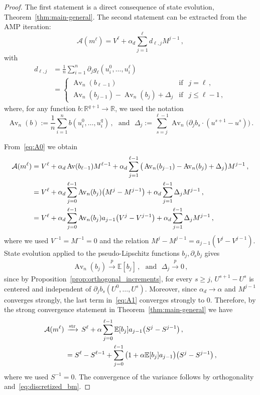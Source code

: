 \documentclass[11pt]{article}
\theoremstyle{definition}
\theoremstyle{remark}
\numberwithin{equation}{section}
\numberwithin{theorem}{section}
\newcommand{\R}{\mathbb R}
\newcommand{\E}{\mathbb E}
\newcommand{\cA}{\mathcal A}
\newcommand{\Av}{\operatorname{Av}}
\begin{document}
\begin{proof}
The first statement is a direct consequence of state evolution, Theorem~\ref{thm:main-general}. The second statement can be extracted from the AMP iteration:
\begin{equation}\label{eq:A0}
	\cA(m^\ell) = V^{\ell} + \alpha_d \sum_{j=1}^\ell d_{\ell,j} M^{j-1}\,,
\end{equation}
  with 
\begin{align}
d_{\ell,j} &= \frac{1}{n} \sum_{i=1}^n \partial_{j}g_{\ell}(u_i^0,\ldots,u_i^\ell)\\
&=
\begin{cases}
\Av_n(b_{\ell-1}) & \mbox{if }~~ j=\ell\,,\\
\Av_n(b_{j-1}) - \Av_n(b_j) + \Delta_j & \mbox{if }~~ j\le\ell-1\,,
\end{cases}
\end{align}
where, for any function $b : \R^{q+1}\to \R$, we used the notation 
\[\Av_n(b) := \frac{1}{n} \sum_{i=1}^n b(u_i^0,\ldots,u_i^q)\,,~~~\mbox{and}~~~ \Delta_j := \sum_{s = j}^{\ell-1} \Av_n\Big(\partial_j b_s \cdot (u^{s+1} - u^s)\Big)\,.\]

From~\eqref{eq:A0} we obtain
\begin{align}\label{eq:A1}
\cA(m^\ell) &= V^{\ell} + \alpha_d  \Av(b_{\ell-1}) M^{\ell-1} + \alpha_d \sum_{j=1}^{\ell-1} \big(\Av_n(b_{j-1}) - \Av_n(b_j) + \Delta_j\big) M^{j-1}\,,\notag\\
&= V^{\ell} + \alpha_d \sum_{j=0}^{\ell-1} \Av_n(b_{j}) \big(M^j - M^{j-1}\big) + \alpha_d \sum_{j=1}^{\ell-1}  \Delta_j M^{j-1}\,,\notag\\
&= V^\ell + \alpha_d \sum_{j=0}^{\ell-1} \Av_n(b_{j}) a_{j-1} \big(V^j - V^{j-1}\big) + \alpha_d \sum_{j=1}^{\ell-1}  \Delta_j M^{j-1}\,,
\end{align}
where we used $V^{-1}=M^{-1}=0$ and the relation $M^{j}-M^{j-1} = a_{j-1}(V^{j}-V^{j-1})$. 
%
State evolution applied to the pseudo-Lipschitz functions $b_j, \partial_s b_j$ gives 
\begin{align*}
\Av_n(b_j) \xrightarrow{p} \E[b_j] \,,~~~\mbox{and}~~~ \Delta_j\xrightarrow{p} 0 \,,
\end{align*}
since by Proposition~\ref{prop:orthogonal_increments}, for every $s\ge j$, $U^{s+1}-U^s$ is centered and independent of $\partial_jb_s(U^0,\ldots,U^s)$. Moreover, since $\alpha_d \to \alpha$ and $M^{j-1}$ converges strongly, the last term in~\eqref{eq:A1} converges strongly to $0$. Therefore, by the strong convergence statement in Theorem~\ref{thm:main-general} we have         
%
\begin{align}\label{eq:A2}
\cA(m^\ell) \,&\xrightarrow{\mathrm{str}}\, S^{\ell} + \alpha \sum_{j=0}^{\ell-1} \E[b_{j}] a_{j-1} \big(S^j - S^{j-1}\big)\,,\notag\\
&= S^{\ell} - S^{\ell-1} +  \sum_{j=0}^{\ell-1} \big(1+\alpha\E[b_{j}] a_{j-1}\big) \big(S^j - S^{j-1}\big)\,,
\end{align}
where we used $S^{-1}=0$.
The convergence of the variance follows by orthogonality and~\eqref{eq:discretized_bm}. 
\end{proof}
\end{document}
